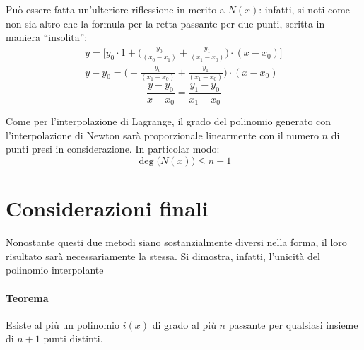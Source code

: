 Può essere fatta un'ulteriore riflessione in merito a $N(x)$: infatti, si noti come non sia altro che la formula per la retta passante per due punti, scritta in maniera ``insolita'':
\begin{gather*}
y=\Bigg[y_0\cdot1+\Bigg(\frac{y_0}{(x_0-x_1)}+\frac{y_1}{(x_1-x_0)}\Bigg)\cdot(x-x_0)\Bigg]\\
y-y_0=\Bigg(-\frac{y_0}{(x_1-x_0)}+\frac{y_1}{(x_1-x_0)}\Bigg)\cdot(x-x_0)\end{gather*}
\begin{equation}
\frac{y-y_0}{x-x_0}=\frac{y_1-y_0}{x_1-x_0}\label{retta:2}
\end{equation}

Come per l'interpolazione di Lagrange, il grado del polinomio generato con l'interpolazione di Newton sarà proporzionale linearmente con il numero $n$ di punti presi in considerazione. In particolar modo:
\[
\deg \big(N(x)\big)\le n-1
\] 

\section{Considerazioni finali}

Nonostante questi due metodi siano sostanzialmente diversi nella forma, il loro risultato sarà necessariamente la stessa. Si dimostra, infatti, l'unicità del polinomio interpolante

\paragraph{Teorema} Esiste al più un polinomio $i(x)$ di grado al più $n$ passante per qualsiasi insieme di $n+1$ punti distinti.

